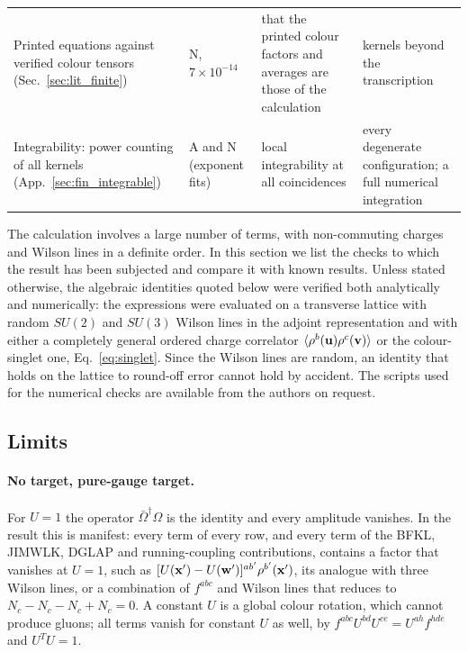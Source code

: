 \begin{longtable}{@{}>{\raggedright\arraybackslash}p{}>{\raggedright\arraybackslash}p{}>{\raggedright\arraybackslash}p{}>{\raggedright\arraybackslash}p{}@{}}
Printed equations against verified colour tensors (Sec.~\ref{sec:lit_finite}) & N, $7\times10^{-14}$ & that the printed colour factors and averages are those of the calculation & kernels beyond the transcription\\
Integrability: power counting of all kernels (App.~\ref{sec:fin_integrable}) & A and N (exponent fits) & local integrability at all coincidences & every degenerate configuration; a full numerical integration\\
\end{longtable}
\endgroup

The calculation involves a large number of terms, with non-commuting charges and Wilson lines in a definite order. In this section we list the checks to which the result has been subjected and compare it with known results. Unless stated otherwise, the algebraic identities quoted below were verified both analytically and numerically: the expressions were evaluated on a transverse lattice with random $SU(2)$ and $SU(3)$ Wilson lines in the adjoint representation and with either a completely general ordered charge correlator $\langle\rho^b(\mathbf{u})\rho^c(\mathbf{v})\rangle$ or the colour-singlet one, Eq.~\eqref{eq:singlet}. Since the Wilson lines are random, an identity that holds on the lattice to round-off error cannot hold by accident. The scripts used for the numerical checks are available from the authors on request.

\subsection{Limits}\label{sec:limits}

\paragraph{No target, pure-gauge target.} For $U=1$ the operator $\bar\Omega^\dagger\Omega$ is the identity and every amplitude vanishes. In the result this is manifest: every term of every row, and every term of the BFKL, JIMWLK, DGLAP and running-coupling contributions, contains a factor that vanishes at $U=1$, such as $[U(\mathbf{x}')-U(\mathbf{w}')]^{ab'}\rho^{b'}(\mathbf{x}')$, its analogue with three Wilson lines, or a combination of $f^{abc}$ and Wilson lines that reduces to $N_c-N_c-N_c+N_c=0$. A constant $U$ is a global colour rotation, which cannot produce gluons; all terms vanish for constant $U$ as well, by $f^{abc}U^{bd}U^{ce}=U^{ah}f^{hde}$ and $U^TU=1$.

